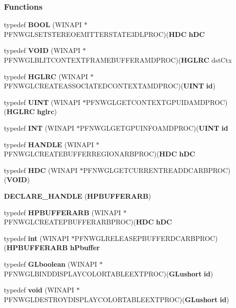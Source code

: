 \subsubsection*{Functions}
\begin{DoxyCompactItemize}
\item 
typedef {\bf B\+O\+OL} (W\+I\+N\+A\+PI $\ast$P\+F\+N\+W\+G\+L\+S\+E\+T\+S\+T\+E\+R\+E\+O\+E\+M\+I\+T\+T\+E\+R\+S\+T\+A\+T\+E3\+D\+L\+P\+R\+OC)({\bf H\+DC} {\bf h\+DC}
\item 
typedef {\bf V\+O\+ID} (W\+I\+N\+A\+PI $\ast$P\+F\+N\+W\+G\+L\+B\+L\+I\+T\+C\+O\+N\+T\+E\+X\+T\+F\+R\+A\+M\+E\+B\+U\+F\+F\+E\+R\+A\+M\+D\+P\+R\+OC)({\bf H\+G\+L\+RC} dst\+Ctx
\item 
typedef {\bf H\+G\+L\+RC} (W\+I\+N\+A\+PI $\ast$P\+F\+N\+W\+G\+L\+C\+R\+E\+A\+T\+E\+A\+S\+S\+O\+C\+I\+A\+T\+E\+D\+C\+O\+N\+T\+E\+X\+T\+A\+M\+D\+P\+R\+OC)({\bf U\+I\+NT} {\bf id})
\item 
typedef {\bf U\+I\+NT} (W\+I\+N\+A\+PI $\ast$P\+F\+N\+W\+G\+L\+G\+E\+T\+C\+O\+N\+T\+E\+X\+T\+G\+P\+U\+I\+D\+A\+M\+D\+P\+R\+OC)({\bf H\+G\+L\+RC} {\bf hglrc})
\item 
typedef {\bf I\+NT} (W\+I\+N\+A\+PI $\ast$P\+F\+N\+W\+G\+L\+G\+E\+T\+G\+P\+U\+I\+N\+F\+O\+A\+M\+D\+P\+R\+OC)({\bf U\+I\+NT} {\bf id}
\item 
typedef {\bf H\+A\+N\+D\+LE} (W\+I\+N\+A\+PI $\ast$P\+F\+N\+W\+G\+L\+C\+R\+E\+A\+T\+E\+B\+U\+F\+F\+E\+R\+R\+E\+G\+I\+O\+N\+A\+R\+B\+P\+R\+OC)({\bf H\+DC} {\bf h\+DC}
\item 
typedef {\bf H\+DC} (W\+I\+N\+A\+PI $\ast$P\+F\+N\+W\+G\+L\+G\+E\+T\+C\+U\+R\+R\+E\+N\+T\+R\+E\+A\+D\+D\+C\+A\+R\+B\+P\+R\+OC)({\bf V\+O\+ID})
\item 
{\bf D\+E\+C\+L\+A\+R\+E\+\_\+\+H\+A\+N\+D\+LE} ({\bf H\+P\+B\+U\+F\+F\+E\+R\+A\+RB})
\item 
typedef {\bf H\+P\+B\+U\+F\+F\+E\+R\+A\+RB} (W\+I\+N\+A\+PI $\ast$P\+F\+N\+W\+G\+L\+C\+R\+E\+A\+T\+E\+P\+B\+U\+F\+F\+E\+R\+A\+R\+B\+P\+R\+OC)({\bf H\+DC} {\bf h\+DC}
\item 
typedef {\bf int} (W\+I\+N\+A\+PI $\ast$P\+F\+N\+W\+G\+L\+R\+E\+L\+E\+A\+S\+E\+P\+B\+U\+F\+F\+E\+R\+D\+C\+A\+R\+B\+P\+R\+OC)({\bf H\+P\+B\+U\+F\+F\+E\+R\+A\+RB} {\bf h\+Pbuffer}
\item 
typedef {\bf G\+Lboolean} (W\+I\+N\+A\+PI $\ast$P\+F\+N\+W\+G\+L\+B\+I\+N\+D\+D\+I\+S\+P\+L\+A\+Y\+C\+O\+L\+O\+R\+T\+A\+B\+L\+E\+E\+X\+T\+P\+R\+OC)({\bf G\+Lushort} {\bf id})
\item 
typedef {\bf void} (W\+I\+N\+A\+PI $\ast$P\+F\+N\+W\+G\+L\+D\+E\+S\+T\+R\+O\+Y\+D\+I\+S\+P\+L\+A\+Y\+C\+O\+L\+O\+R\+T\+A\+B\+L\+E\+E\+X\+T\+P\+R\+OC)({\bf G\+Lushort} {\bf id})

\end{DoxyCompactItemize}
